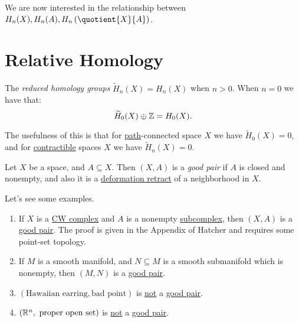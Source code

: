 We are now interested in the relationship between \(H_{n}(X), H_{n} (A), H_{n} \left(\quotient{X}{A}\right)\).

\section{Relative Homology}
\begin{definition}\label{def:reduced-homology-group}
	The \emph{reduced homology groups} \(\widetilde{H}_n(X) = H_n(X)\) when \(n > 0\). When \(n = 0\) we have that:
	\[
		\widetilde{H}_0(X) \oplus \mathbb{\MakeUppercase{z}} = H_0(X).
	\]
\end{definition}
\begin{remark}
	The usefulness of this is that for \hyperref[def:path]{path}-connected space \(X\) we have \(\widetilde{H}_0(X) = 0\), and for
	\hyperref[def:contractible]{contractible} spaces \(X\) we have \(\widetilde{H}_n(X) = 0\).
\end{remark}

\begin{definition}\label{def:good-pair}
	Let \(X\) be a space, and \(A \subseteq X\). Then \((X, A)\) is a \emph{good pair} if \(A\) is closed and nonempty, and also it is a
	\hyperref[def:deformation-retraction]{deformation retract} of a neighborhood in \(X\).
\end{definition}

\begin{eg}
	Let's see some examples.
	\begin{enumerate}
		\item If \(X\) is a \hyperref[def:CW-Complex]{CW complex} and \(A\) is a nonempty \hyperref[def:CW-subcomplex]{subcomplex}, then \((X, A)\)
		      is a \hyperref[def:good-pair]{good pair}. The proof is given in the Appendix of Hatcher\cite{hatcher2002algebraic} and requires some
		      point-set topology.
		\item If \(M\) is a smooth manifold, and \(N\subseteq M\) is a smooth submanifold which is nonempty, then \((M, N)\) is a \hyperref[def:good-pair]{good pair}.
		\item \((\text{Hawaiian earring}, \text{bad point})\) is \underline{not} a \hyperref[def:good-pair]{good pair}.
		\item \((\mathbb{\MakeUppercase{r}} ^n, \text{ proper open set})\) is \underline{not} a \hyperref[def:good-pair]{good pair}.
	\end{enumerate}
\end{eg}

